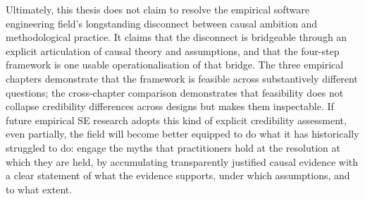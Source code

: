 Ultimately, this thesis does not claim to resolve the empirical software engineering field's longstanding disconnect between causal ambition and methodological practice.
It claims that the disconnect is bridgeable through an explicit articulation of causal theory and assumptions, and that the four-step framework is one usable operationalisation of that bridge.
The three empirical chapters demonstrate that the framework is feasible across substantively different questions; the cross-chapter comparison demonstrates that feasibility does not collapse credibility differences across designs but makes them inspectable.
If future empirical SE research adopts this kind of explicit credibility assessment, even partially, the field will become better equipped to do what it has historically struggled to do: engage the myths that practitioners hold at the resolution at which they are held, by accumulating transparently justified causal evidence with a clear statement of what the evidence supports, under which assumptions, and to what extent.

